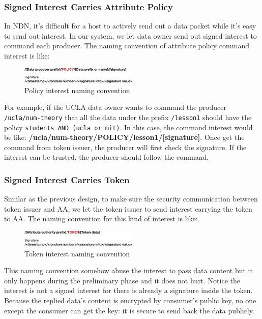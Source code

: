 \subsubsection{Signed Interest Carries Attribute Policy}

In NDN, it's difficult for a host to actively send out a data packet while it's easy to send out interest.
In our system, we let data owner send out signed interest to command each producer.
The naming convention of attribute policy command interest is like:

\begin{figure}[H]
  \centering
  \includegraphics[width=0.5\textwidth]{figures/policy-interest}
  \vspace{-3mm}
  \caption{Policy interest naming convention}
\end{figure}

For example, if the UCLA data owner wants to command the producer \texttt{/ucla/num-theory} that all the data under the prefix \texttt{/lesson1} should have the policy \texttt{students AND (ucla or mit)}.
In this case, the command interest would be like: \textbf{/ucla/num-theory/POLICY/lesson1/[signature]}.
Once get the command from token issuer, the producer will first check the signature.
If the interest can be trusted, the producer should follow the command.

\subsubsection{Signed Interest Carries Token}

Similar as the previous design, to make sure the security communication between token issuer and AA, we let the token issuer to send interest carrying the token to AA.
The naming convention for this kind of  interest is like:

\begin{figure}[H]
  \centering
  \includegraphics[width=0.5\textwidth]{figures/token-interest}
  \vspace{-3mm}
  \caption{Token interest naming convention}
\end{figure}

This naming convention somehow abuse the interest to pass data content but it only happens during the preliminary phase and it does not hurt.
Notice the interest is not a signed interest for there is already a signature inside the token.
Because the replied data's content is encrypted by consumer's public key, no one except the consumer can get the key: it is secure to send back the data publicly.

